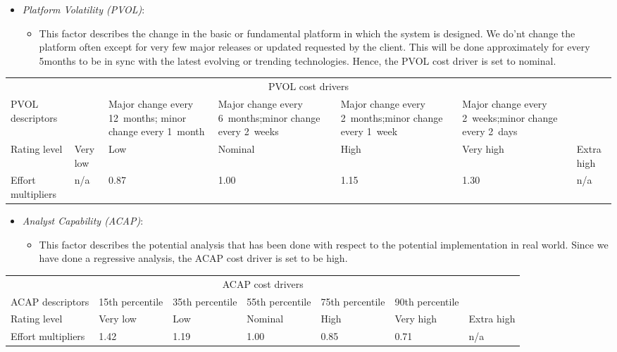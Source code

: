 \begin{itemize}
	\item \emph{Platform Volatility (PVOL)}:
	\begin{itemize}
		\item[] This factor describes the change in the basic or fundamental platform in which the system is designed. We do'nt change the platform often except for very few major releases or updated requested by the client. This will be done approximately for every 5months to be in sync with the latest evolving or trending technologies. Hence, the PVOL cost driver is set to nominal.
	\end{itemize}
\end{itemize}

\begin{table}[H]
	\hspace*{-1.7cm}
	\begin{tabular}{|p{2cm}|p{2cm}|p{2cm}|p{2cm}|p{2cm}|p{2cm}|p{2cm}|}
		\hline
		\multicolumn{7}{|c|}{PVOL cost drivers} \\
		\hhline{|=======|}
		PVOL descriptors & & Major change every 12~months; minor change every 1~month & Major change every 6~months;\newline minor change every 2~weeks & Major change every 2~months;\newline minor change every 1~week & Major change every 2~weeks;\newline minor change every 2~days & \\
		\hline
		Rating level & Very low & Low & Nominal & High & Very high & Extra high \\
		\hline
		Effort multipliers & n/a & 0.87 & 1.00 & 1.15 & 1.30 & n/a \\
		\hline
	\end{tabular}
\end{table}

\begin{itemize}
	\item \emph{Analyst Capability (ACAP)}:
	\begin{itemize}
		\item[] This factor describes the potential analysis that has been done with respect to the potential implementation in real world. Since we have done a regressive analysis, the ACAP cost driver is set to be high.
	\end{itemize}
\end{itemize}

\begin{table}[H]
	\hspace*{-1.7cm}
	\begin{tabular}{|p{2cm}|p{2cm}|p{2cm}|p{2cm}|p{2cm}|p{2cm}|p{2cm}|}
		\hline
		\multicolumn{7}{|c|}{ACAP cost drivers} \\
		\hhline{|=======|}
		ACAP descriptors & 15th percentile & 35th percentile & 55th percentile & 75th percentile & 90th percentile & \\
		\hline
		Rating level & Very low & Low & Nominal & High & Very high & Extra high \\
		\hline
		Effort multipliers & 1.42 & 1.19 & 1.00 & 0.85 & 0.71 & n/a \\
		\hline
	\end{tabular}
\end{table}